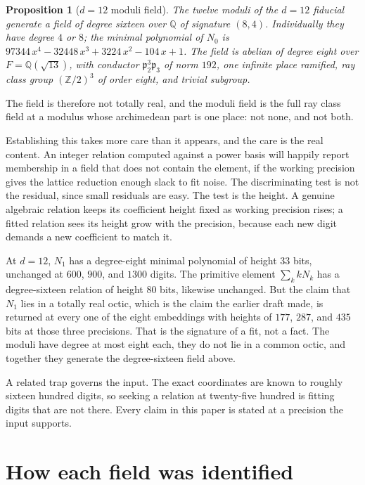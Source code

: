 \documentclass[12pt,a4paper]{article}
\newtheorem{proposition}[theorem]{Proposition}
\newcommand{\Fd}{F}
\newcommand{\pt}{\mathfrak{p}_2}
\begin{document}
\begin{proposition}[$d=12$ moduli field]
\label{prop:d12}
The twelve moduli of the $d=12$ fiducial generate a field of degree sixteen over
$\mathbb{Q}$ of signature $(8,4)$. Individually they have degree $4$ or $8$; the
minimal polynomial of $N_0$ is
$97344\,x^4 - 32448\,x^3 + 3224\,x^2 - 104\,x + 1$. The field is abelian of
degree eight over $\Fd = \mathbb{Q}(\sqrt{13})$, with conductor
$\pt^3\mathfrak{p}_3$ of norm $192$, \emph{one} infinite place ramified, ray
class group $(\mathbb{Z}/2)^3$ of order eight, and trivial subgroup.
\end{proposition}

The field is therefore not totally real, and the moduli field is the full ray
class field at a modulus whose archimedean part is one place: not none, and not
both.

Establishing this takes more care than it appears, and the care is the real
content. An integer relation computed against a power basis will happily report
membership in a field that does not contain the element, if the working
precision gives the lattice reduction enough slack to fit noise. The
discriminating test is not the residual, since small residuals are easy. The
test is the height. A genuine algebraic relation keeps its coefficient height
fixed as working precision rises; a fitted relation sees its height grow with
the precision, because each new digit demands a new coefficient to match it.

At $d=12$, $N_1$ has a degree-eight minimal polynomial of height $33$ bits,
unchanged at $600$, $900$, and $1300$ digits. The primitive element
$\sum_k k N_k$ has a degree-sixteen relation of height $80$ bits, likewise
unchanged. But the claim that $N_1$ lies in a totally real octic, which is the
claim the earlier draft made, is returned at every one of the eight embeddings
with heights of $177$, $287$, and $435$ bits at those three precisions. That is
the signature of a fit, not a fact. The moduli have degree at most eight each,
they do not lie in a common octic, and together they generate the degree-sixteen
field above.

A related trap governs the input. The exact coordinates are known to roughly
sixteen hundred digits, so seeking a relation at twenty-five hundred is fitting
digits that are not there. Every claim in this paper is stated at a precision
the input supports.

\section{How each field was identified}
\label{sec:method}
\end{document}
